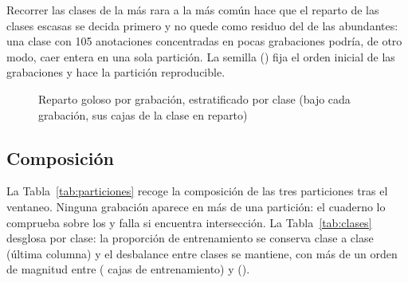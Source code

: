 \documentclass[12pt,a4paper]{article}
\begin{document}
Recorrer las clases de la más rara a la más común hace que el reparto de las clases escasas se
decida primero y no quede como residuo del de las abundantes: una clase con 105 anotaciones
concentradas en pocas grabaciones podría, de otro modo, caer entera en una sola partición. La
semilla (\seed{}) fija el orden inicial de las grabaciones y hace la partición reproducible.

\begin{figure}[htbp]
    \centering
    \caption{Reparto goloso por grabación, estratificado por clase (bajo cada grabación,
        sus cajas de la clase en reparto)}
    \label{fig:reparto}
\end{figure}

\subsection{Composición}

La Tabla~\ref{tab:particiones} recoge la composición de las tres particiones tras el ventaneo.
Ninguna grabación aparece en más de una partición: el cuaderno lo comprueba sobre los
 y falla si encuentra intersección. La Tabla~\ref{tab:clases} desglosa
por clase: la proporción de entrenamiento se conserva clase a clase (última columna) y el
desbalance entre clases se mantiene, con más de un orden de magnitud entre \largestClass{}
(\largestClassTrain{} cajas de entrenamiento) y \smallestClass{} (\smallestClassTrain{}).
\end{document}
